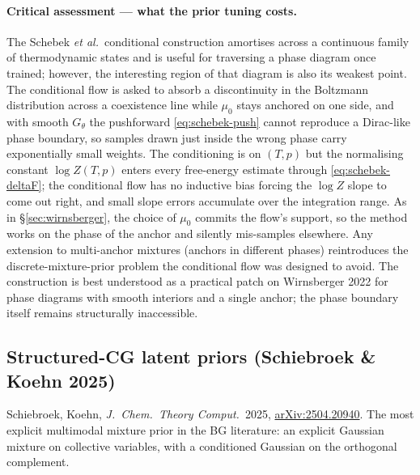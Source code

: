 \documentclass[11pt,letterpaper]{article}
\theoremstyle{plain}
\begin{document}
\paragraph{Critical assessment --- what the prior tuning costs.} The Schebek
\emph{et al.}\ conditional construction amortises across a continuous family
of thermodynamic states and is useful for traversing a phase diagram once
trained; however, the interesting region of that diagram is also its weakest
point. The conditional flow is asked to absorb a discontinuity in the
Boltzmann distribution across a coexistence line while $\mu_0$ stays anchored
on one side, and with smooth $G_\theta$ the pushforward
\eqref{eq:schebek-push} cannot reproduce a Dirac-like phase boundary, so
samples drawn just inside the wrong phase carry exponentially small weights.
The conditioning is on $(T,p)$ but the normalising constant $\log Z(T,p)$
enters every free-energy estimate through \eqref{eq:schebek-deltaF}; the
conditional flow has no inductive bias forcing the $\log Z$ slope to come out
right, and small slope errors accumulate over the integration range. As in
\S\ref{sec:wirnsberger}, the choice of $\mu_0$ commits the flow's support,
so the method works on the phase of the anchor and silently mis-samples
elsewhere. Any extension to multi-anchor mixtures (anchors in different
phases) reintroduces the discrete-mixture-prior problem the conditional flow
was designed to avoid. The construction is best understood as a practical
patch on Wirnsberger 2022 for phase diagrams with smooth interiors and a
single anchor; the phase boundary itself remains structurally inaccessible.

\subsection{Structured-CG latent priors (Schiebroek \& Koehn 2025)}
\label{sec:schiebroek}

Schiebroek, Koehn, \emph{J.\ Chem.\ Theory Comput.}\ 2025,
\href{https://arxiv.org/abs/2504.20940}{arXiv:2504.20940}. The most
explicit multimodal mixture prior in the BG literature: an explicit
Gaussian mixture on collective variables, with a conditioned Gaussian on
the orthogonal complement.
\end{document}
